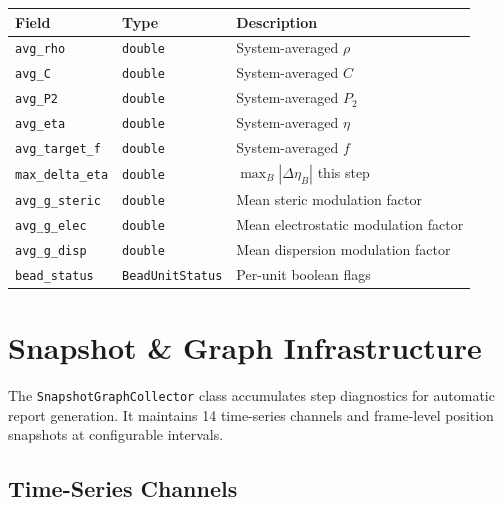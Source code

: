 \documentclass[11pt, a4paper, oneside]{article}
\newcommand{\type}[1]{\texttt{#1}}
\newcommand{\field}[1]{\texttt{#1}}
\begin{document}
\begin{center}
\begin{tabular}{lll}
  \toprule
  \textbf{Field} & \textbf{Type} & \textbf{Description} \\
  \midrule
  \field{avg\_rho}      & \texttt{double} & System-averaged $\rho$ \\
  \field{avg\_C}        & \texttt{double} & System-averaged $C$ \\
  \field{avg\_P2}       & \texttt{double} & System-averaged $P_2$ \\
  \field{avg\_eta}      & \texttt{double} & System-averaged $\eta$ \\
  \field{avg\_target\_f} & \texttt{double} & System-averaged $f$ \\
  \field{max\_delta\_eta} & \texttt{double} & $\max_B |\Delta\eta_B|$ this step \\
  \field{avg\_g\_steric}  & \texttt{double} & Mean steric modulation factor \\
  \field{avg\_g\_elec}    & \texttt{double} & Mean electrostatic modulation factor \\
  \field{avg\_g\_disp}    & \texttt{double} & Mean dispersion modulation factor \\
  \field{bead\_status}    & \type{BeadUnitStatus} & Per-unit boolean flags \\
  \bottomrule
\end{tabular}
\end{center}

\newpage
\section{Snapshot \& Graph Infrastructure}
\label{sec:snapshot-graph}

The \type{SnapshotGraphCollector} class accumulates step diagnostics
for automatic report generation.  It maintains 14 time-series channels
and frame-level position snapshots at configurable intervals.

\subsection{Time-Series Channels}
\label{sec:timeseries-channels}
\end{document}
